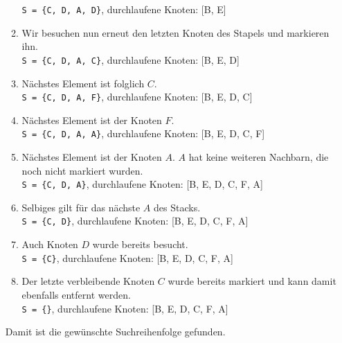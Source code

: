 \documentclass[11pt,a4paper]{scrartcl}
\begin{document}
\begin{itemize}
\begin{enumerate}
\texttt{S = \{C, D, A, D\}}, durchlaufene Knoten: [B, E]
\item Wir besuchen nun erneut den letzten Knoten des Stapels und markieren ihn. \\
\texttt{S = \{C, D, A, C\}}, durchlaufene Knoten: [B, E, D]
\item Nächstes Element ist folglich $C$. \\
\texttt{S = \{C, D, A, F\}}, durchlaufene Knoten: [B, E, D, C]
\item Nächstes Element ist der Knoten $F$. \\
\texttt{S = \{C, D, A, A\}}, durchlaufene Knoten: [B, E, D, C, F]
\item Nächstes Element ist der Knoten $A$. $A$ hat keine weiteren Nachbarn, die noch nicht markiert wurden. \\
\texttt{S = \{C, D, A\}}, durchlaufene Knoten: [B, E, D, C, F, A]
\item Selbiges gilt für das nächste $A$ des Stacks. \\
\texttt{S = \{C, D\}}, durchlaufene Knoten: [B, E, D, C, F, A]
\item Auch Knoten $D$ wurde bereits besucht. \\
\texttt{S = \{C\}}, durchlaufene Knoten: [B, E, D, C, F, A]
\item Der letzte verbleibende Knoten $C$ wurde bereits markiert und kann damit ebenfalls entfernt werden. \\
\texttt{S = \{\}}, durchlaufene Knoten: [B, E, D, C, F, A]
\end{enumerate}
Damit ist die gewünschte Suchreihenfolge gefunden.
\end{itemize} 
\end{document}
